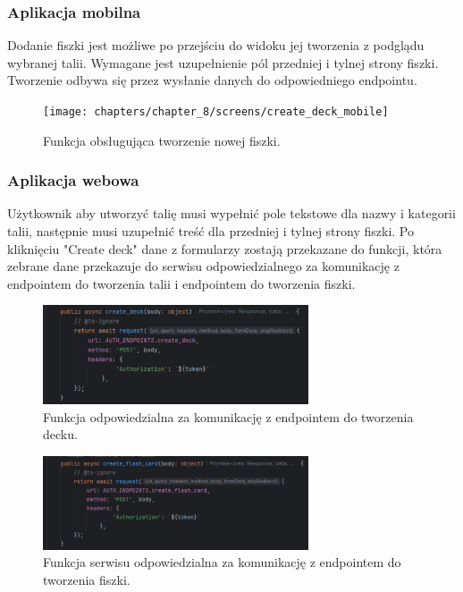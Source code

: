 \subsubsection{Aplikacja mobilna}
Dodanie fiszki jest możliwe po przejściu do widoku jej tworzenia z podglądu wybranej talii. Wymagane jest uzupełnienie pól przedniej i tylnej strony fiszki. Tworzenie odbywa się przez wysłanie danych do odpowiedniego endpointu.

\begin{figure}[H]
    \centering
    \texttt{[image: chapters/chapter\_8/screens/create\_deck\_mobile]}
    \caption{Funkcja obsługująca tworzenie nowej fiszki.}
    \label{img:create_deck_mobile}
\end{figure}

\subsubsection{Aplikacja webowa}

Użytkownik aby utworzyć talię musi wypełnić pole tekstowe dla nazwy i kategorii talii, następnie musi uzupełnić treść dla przedniej i tylnej strony fiszki. Po kliknięciu "Create deck" dane z formularzy zostają przekazane do funkcji, która zebrane dane przekazuje do serwisu odpowiedzialnego za komunikację z endpointem do tworzenia talii i endpointem do tworzenia fiszki.

\begin{figure}[H]
    \centering
    \includegraphics[width=0.7\textwidth]{chapters/chapter_8/screens/create_deck_web}
    \caption{Funkcja odpowiedzialna za komunikację z endpointem do tworzenia decku.}
    \label{img:create_deck_web}
\end{figure}

\begin{figure}[H]
    \centering
    \includegraphics[width=0.7\textwidth]{chapters/chapter_8/screens/create_flash_card_web}
    \caption{Funkcja serwisu odpowiedzialna za komunikację z endpointem do tworzenia fiszki.}
    \label{img:create_flash_card_web}
\end{figure}

